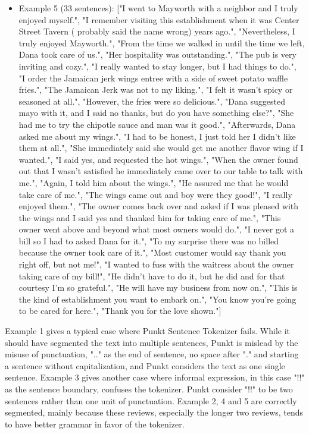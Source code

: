 \documentclass[sigconf]{acmart}
\begin{document}
\begin{itemize}
\item{Example 5 (33 sentences)}: ["I went to Mayworth with a neighbor and I truly enjoyed myself.", "I remember visiting this establishment when it was Center Street Tavern ( probably said the name wrong) years ago.", "Nevertheless, I truly enjoyed Mayworth.", "From the time we walked in until the time we left,  Dana took care of us.", "Her hospitality was outstanding.", "The pub is very inviting and cozy.", "I really wanted to stay longer, but I had things to do.", "I order the Jamaican jerk wings entree with a side of sweet potato waffle fries.", "The Jamaican Jerk was not to my liking.", "I felt it wasn't spicy or seasoned at all.", "However, the fries were so delicious.", "Dana suggested mayo with it, and I said no thanks, but do you have something else?", "She had me to try the chipotle sauce and man was it good.", "Afterwards, Dana asked me about my wings.", "I had to be honest, I just told her I didn't like them at all.", "She immediately said she would get me another flavor wing if I wanted.", "I said yes, and requested the  hot wings.", "When the owner found out that I wasn't satisfied he immediately came over to our table to talk with me.", "Again, I told him about the wings.", "He assured me that he would take care of me.", "The wings came out and boy were they good!", "I really enjoyed them.", "The owner comes back over and asked if I was pleased with the wings and I said yes and thanked him for taking care of me.", "This owner went above and beyond what most owners would do.", "I never got a bill so I had to asked Dana for it.", "To my surprise there was no billed because the owner took care of it.", "Most customer would say thank you right off, but not me!", "I wanted to fuss with the waitress about the owner taking care of my bill!", "He didn't have to do it, but he did and for that courtesy I'm so grateful.", "He will have my business from now on.", "This is the kind of establishment you want to embark on.", "You know you're going to be cared for here.", "Thank you for the love shown."]
\end{itemize}

Example 1 gives a typical case where Punkt Sentence Tokenizer fails. While it should have segmented the text into multiple sentences, Punkt is mislead by the misuse of punctuation, ".." as the end of sentence, no space after "." and starting a sentence without capitalization, and Punkt considers the text as one single sentence. Example 3 gives another case where informal expression, in this case "!!" as the sentence boundary, confuses the tokenizer. Punkt consider "!!" to be two sentences rather than one unit of punctuation. Example 2, 4 and 5 are correctly segmented, mainly because these reviews, especially the longer two reviews, tends to have better grammar in favor of the tokenizer.
\end{document}
